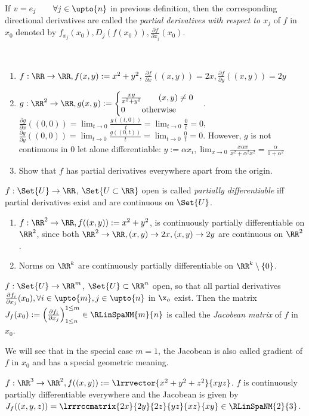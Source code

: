 \begin{defn}
  If $v=e_j\qquad\forall j\in\upto{n}$ in previous definition, then the corresponding directional derivatives are called the \emph{partial derivatives with respect to $x_j$} of $f$ in $x_0$ denoted by $f_{x_j}(x_0), D_j(f(x_0)), \frac{\partial f}{\partial x_j}(x_0)$. 
\end{defn}
\begin{exam}\ 
  \begin{enumerate}
  	\item $f:\RR\to\RR, f(x,y):=x^2+y^2$, $\frac{\partial f}{\partial x}((x,y))=2x, \frac{\partial f}{\partial y}((x,y))=2y$
  	\item $g:\RR^2\to\RR, g(x,y):=\begin{cases}
  	\frac{xy}{x^2+y^2}\qquad (x,y)\neq 0\\0\qquad\text{otherwise}\end{cases}$. $\frac{\partial g}{\partial x}((0,0))=\lim_{t\to 0}\frac{g((t,0))}{t}=\lim_{t\to 0}\frac{0}{t}=0$, $\frac{\partial g}{\partial y}((0,0))=\lim_{t\to 0}\frac{g((0,t))}{t}=\lim_{t\to 0}\frac{0}{t}=0$. However, $g$ is not continuous in 0 let alone differentiable: $y:=\alpha x_i, \lim_{x\to 0}\frac{x\alpha x}{x^2+\alpha^2x^2}=\frac{\alpha}{1+\alpha^2}$
  	\item Show that $f$ has partial derivatives everywhere apart from the origin. 
  \end{enumerate}
\end{exam}
\begin{defn}
  $f:\Set{U}\to\RR$, $\Set{U\subset\RR}$ open is called \emph{partially differentiable} iff partial derivatives exist and are continuous on $\Set{U}$. 
\end{defn}
\begin{exam}
  \begin{enumerate}
  	\item $f:\RR^2\to\RR, f((x,y)):=x^2+y^2$, is continuously partially differentiable on $\RR^2$, since both $\RR^2\to \RR, (x,y)\to2x, (x,y)\to2y$ are continuous on $\RR^2$. 
  	\item Norms on $\RR^k$ are continuously partially differentiable on $\RR^k\setminus\{0\}$. 
  \end{enumerate}
\end{exam}
\begin{defn}[Jacobean]
  $f:\Set{U}\to\RR^m$, $\Set{U}\subset\RR^n$ open, so that all partial derivatives $\frac{\partial f_i}{\partial x_j}(x_0), \forall i\in\upto{m}, j\in\upto{n}$ in $\x_o$ exist. Then the matrix $J_f(x_0):=\left(\frac{\partial f_i}{\partial x_j}\right)_{1\leq n}^{1\leq m}\in\RLinSpaNM{m}{n}$ is called the \emph{Jacobean matrix} of $f$ in $x_0$. 
\end{defn}
\begin{rem}
  We will see that in the special case $m=1$, the Jacobean is also called gradient of $f$ in $x_0$ and has a special geometric meaning. 
\end{rem}
\begin{exam}
  $f:\RR^3\to\RR^2, f((x,y)):=\lrrvector{x^2+y^2+z^2}{xyz}$. $f$ is continuously partially differentiable everywhere and the Jacobean is given by $J_f((x,y,z))=\lrrrccmatrix{2x}{2y}{2z}{yz}{xz}{xy}\in\RLinSpaNM{2}{3}$. 
\end{exam}

